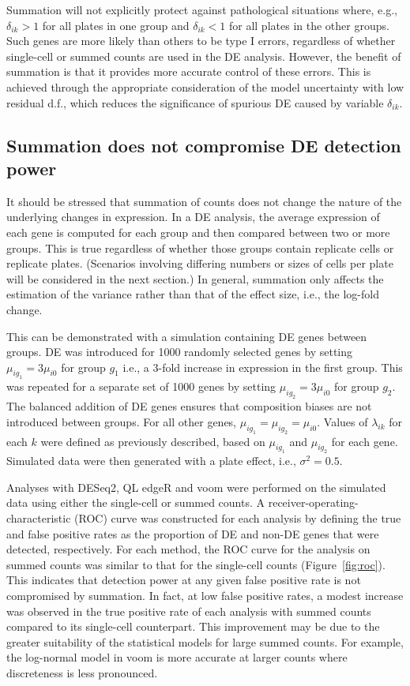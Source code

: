 \documentclass[oupdraft]{bio}
\begin{document}
Summation will not explicitly protect against pathological situations where, e.g., $\delta_{ik} > 1$ for all plates in one group and $\delta_{ik} < 1$ for all plates in the other groups.
Such genes are more likely than others to be type I errors, regardless of whether single-cell or summed counts are used in the DE analysis.
However, the benefit of summation is that it provides more accurate control of these errors.
This is achieved through the appropriate consideration of the model uncertainty with low residual d.f., which reduces the significance of spurious DE caused by variable $\delta_{ik}$.

\subsection{Summation does not compromise DE detection power}
It should be stressed that summation of counts does not change the nature of the underlying changes in expression.
In a DE analysis, the average expression of each gene is computed for each group and then compared between two or more groups.
This is true regardless of whether those groups contain replicate cells or replicate plates. 
(Scenarios involving differing numbers or sizes of cells per plate will be considered in the next section.)
In general, summation only affects the estimation of the variance rather than that of the effect size, i.e., the log-fold change.

This can be demonstrated with a simulation containing DE genes between groups.
DE was introduced for 1000 randomly selected genes by setting $\mu_{ig_1} = 3\mu_{i0}$ for group $g_1$ i.e., a 3-fold increase in expression in the first group.
This was repeated for a separate set of 1000 genes by setting $\mu_{ig_2} = 3\mu_{i0}$ for group $g_2$.
The balanced addition of DE genes ensures that composition biases \citep{robinson2010scaling} are not introduced between groups.
For all other genes, $\mu_{ig_1}=\mu_{ig_2}=\mu_{i0}$.
Values of $\lambda_{ik}$ for each $k$ were defined as previously described, based on $\mu_{ig_1}$ and $\mu_{ig_2}$ for each gene.
Simulated data were then generated with a plate effect, i.e., $\sigma^2=0.5$.

Analyses with DESeq2, QL edgeR and voom were performed on the simulated data using either the single-cell or summed counts.
A receiver-operating-characteristic (ROC) curve was constructed for each analysis by defining the true and false positive rates as the proportion of DE and non-DE genes that were detected, respectively.
For each method, the ROC curve for the analysis on summed counts was similar to that for the single-cell counts (Figure~\ref{fig:roc}).
This indicates that detection power at any given false positive rate is not compromised by summation.
In fact, at low false positive rates, a modest increase was observed in the true positive rate of each analysis with summed counts compared to its single-cell counterpart.
This improvement may be due to the greater suitability of the statistical models for large summed counts.
For example, the log-normal model in voom is more accurate at larger counts where discreteness is less pronounced.
\end{document}
